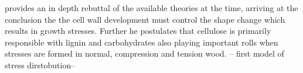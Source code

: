 \cite{ISI:A1950XU10300003} provides an in depth rebuttal of the available theories at the
time, arriving at the conclusion the the cell wall development must control the shape
change which results in growth stresses. Further he postulates that cellulose
is primarily responsible with lignin and carbohydrates also playing important
rolls when stresses are formed in normal, compression and tension wood. 
--\cite{boyd1950a} first model of stress dirstobution--